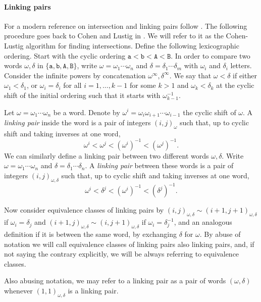 \documentclass{article}
\begin{document}
	\paragraph{Linking pairs} For a modern reference on intersection and linking pairs follow \cite{Cha2004}. The following procedure goes back to Cohen and Lustig in \cite{CL87}. We will refer to it as the Cohen-Lustig algorithm for finding intersections. Define the following lexicographic ordering. Start with the cyclic ordering $\mathtt{a}<\mathtt{b}<\mathtt{A}<\mathtt{B}$. In order to compare two words $\omega,\delta$ in $\{\mathtt{a},\mathtt{b},\mathtt{A},\mathtt{B}\}$, write $\omega=\omega_1\cdots\omega_n$ and $\delta=\delta_1\cdots \delta_m$ with $\omega_i$ and $\delta_i$ letters. Consider the infinite powers by concatenation $\omega^\infty,\delta^\infty$. We say that $\omega<\delta$ if either $\omega_1<\delta_1$, or $\omega_i=\delta_i$ for all $i=1,\hdots, k-1$ for some $k>1$ and $\omega_k<\delta_k$ at the cyclic shift of the initial ordering such that it starts with $\omega_{k-1}^{-1}$.
	
	Let $\omega=\omega_1\cdots \omega_n$ be a word. Denote by $\omega^i=\omega_{i}\omega_{i+1}\cdots \omega_{i-1}$ the cyclic shift of $\omega$. A \emph{linking pair} inside the word is a pair of integers $(i,j)_\omega$ such that, up to cyclic shift and taking inverses at one word,
	\[
	\omega^i<\omega^j<{(\omega^i)}^{-1}<{(\omega^j)}^{-1}.
	\]
	We can similarly define a linking pair between two different words $\omega,\delta$. Write $\omega=\omega_1\cdots\omega_n$ and $\delta=\delta_1\cdots\delta_n$. A \emph{linking pair} between these words is a pair of integers $(i,j)_{\omega,\delta}$ such that, up to cyclic shift and taking inverses at one word,
	\[
	\omega^i<\delta^j<(\omega^i)^{-1}<(\delta^{j})^{-1}.
	\]
	
	Now consider equivalence classes of linking pairs by $(i,j)_{\omega,\delta}\sim (i+1,j+1)_{\omega,\delta}$ if $\omega_i=\delta_j$ and $(i+1,j)_{\omega,\delta}\sim (i,j+1)_{\omega,\delta}$ if $\omega_i=\delta_j^{-1}$, and an analogous definition if it is between the same word, by exchanging $\delta$ for $\omega$. By abuse of notation we will call equivalence classes of linking pairs also linking pairs, and, if not saying the contrary explicitly, we will be always referring to equivalence classes.
	
	Also abusing notation, we may refer to a linking pair as a pair of words $(\omega,\delta)$ whenever $(1,1)_{\omega,\delta}$ is a linking pair.
	
\end{document}
